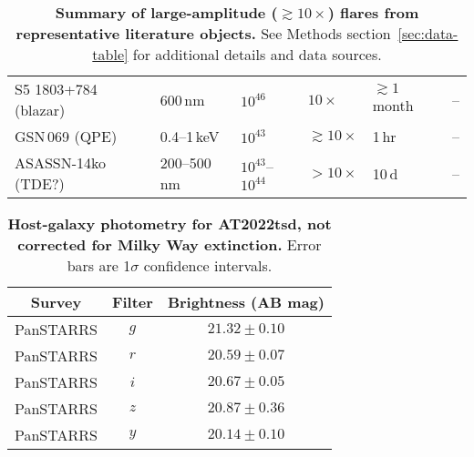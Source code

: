 \documentclass{nature_plusfigure}
\newcommand{\at}{AT2022tsd}
\begin{document}
\begin{supplement}
\begin{table}
\begin{tabular}{llllll}
    S5 1803+784 (blazar) & 600\,nm & $10^{46}$ & $10\times$ & $\gtrsim1\,$month & -- \\
    GSN\,069 (QPE) & 0.4--1\,keV & $10^{43}$ & $\gtrsim10\times$ & 1\,hr & -- \\
    ASASSN-14ko (TDE?) & 200--500\,nm & $10^{43}$--$10^{44}$ & $>10\times$ & 10\,d & -- \\
    \hline\hline
    \end{tabular}
    \caption{\textbf{Summary of large-amplitude ($\gtrsim10\times$) flares from representative literature objects.} See Methods section~\ref{sec:data-table} for additional details and data sources.}
    \label{tab:flaring-classes}
\end{table}

\clearpage

%

\begin{table}
\begin{center}
\caption{\textbf{Host-galaxy photometry for \at, not corrected for Milky Way extinction.} Error bars are 1$\sigma$ confidence intervals.}
\label{tab:host-photometry}
\begin{tabular}{ccc} 
\hline\hline
Survey & Filter & Brightness (AB mag) \\
\hline
PanSTARRS & $g$               &$ 21.32 \pm 0.10 $\\
PanSTARRS & $r$               &$ 20.59 \pm 0.07 $\\
PanSTARRS & $i$               &$ 20.67 \pm 0.05 $\\
PanSTARRS & $z$               &$ 20.87 \pm 0.36 $\\
PanSTARRS & $y$               &$ 20.14 \pm 0.10 $\\
\hline
\end{tabular}
\end{center}
\end{table}


\end{supplement}
\end{document}
